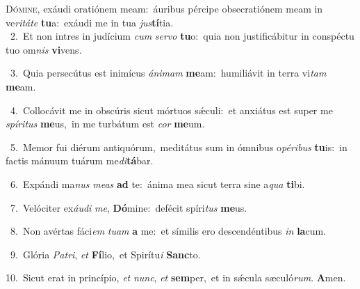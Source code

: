 \lettrine{\initial\textcolor{\initialcolor}{D}}{ómine,} exáudi oratiónem meam:~\dagger áuribus pércipe obsecratiónem meam in ve\-\textit{ri}\-\textit{tá}\textit{te} \textbf{tu}\-a:~\star exáudi me in tua \textit{jus}\-\textbf{tí}tia.\\
{\numbfont\textcolor{\numbcolor}{~2.}}~Et non intres in judícium \textit{cum} \textit{ser}\-\textit{vo} \textbf{tu}\-o:~\star quia non justificábitur in conspéctu tuo om\textit{nis} \textbf{vi}\-vens.\par
{\numbfont\textcolor{\numbcolor}{~3.}}~Quia persecútus est inimícus \textit{á}\-\textit{ni}\textit{mam} \textbf{me}\-am:~\star humiliávit in terra vi\textit{tam} \textbf{me}\-am.\par
{\numbfont\textcolor{\numbcolor}{~4.}}~Collocávit me in obscúris sicut mórtuos sǽculi:~\dagger et anxiátus est super me \textit{spí}\-\textit{ri}\textit{tus} \textbf{me}\-us,~\star in me turbátum est \textit{cor} \textbf{me}\-um.\par
{\numbfont\textcolor{\numbcolor}{~5.}}~Memor fui diérum antiquórum,~\dagger meditátus sum in ómnibus o\-\textit{pé}\-\textit{ri}\textit{bus} \textbf{tu}\-is:~\star in factis mánuum tuárum me\-\textit{di}\-\textbf{tá}bar.\par
{\numbfont\textcolor{\numbcolor}{~6.}}~Expándi ma\textit{nus} \textit{me}\-\textit{as} \textbf{ad} te:~\star ánima mea sicut terra sine a\textit{qua} \textbf{ti}\-bi.\par
{\numbfont\textcolor{\numbcolor}{~7.}}~Velóciter ex\-\textit{áu}\-\textit{di} \textit{me}\-, \textbf{Dó}\-mine:~\star defécit spíri\textit{tus} \textbf{me}\-us.\par
{\numbfont\textcolor{\numbcolor}{~8.}}~Non avértas fáci\textit{em} \textit{tu}\-\textit{am} \textbf{a} me:~\star et símilis ero descendéntibus \textit{in} \textbf{la}\-cum.\par
{\numbfont\textcolor{\numbcolor}{~9.}}~Glória \textit{Pa}\-\textit{tri}, \textit{et} \textbf{Fí}\-lio,~\star et Spirítu\textit{i} \textbf{Sanc}\-to.\par
{\numbfont\textcolor{\numbcolor}{10.}}~Sicut erat in princípio, \textit{et} \textit{nunc}\-, \textit{et} \textbf{sem}\-per,~\star et in sǽcula sæculó\-\textit{rum}\-. \textbf{A}\-men.\par
